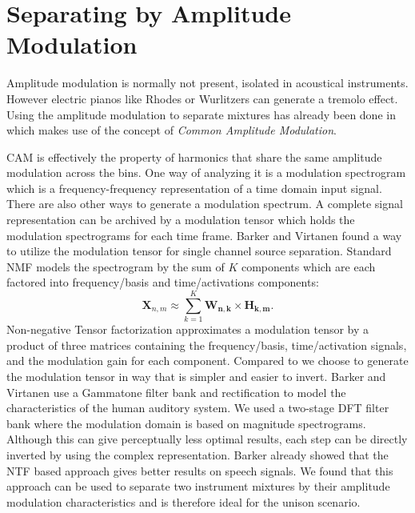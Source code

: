 \section{Separating by Amplitude Modulation}
\label{sub:am}

Amplitude modulation is normally not present, isolated in acoustical instruments. However electric pianos like Rhodes or Wurlitzers can generate a tremolo effect. Using the amplitude modulation to separate mixtures has already been done in \cite{li2009monaural} which makes use of the concept of \emph{Common Amplitude Modulation}.

\textsc{CAM} is effectively the property of harmonics that share the same amplitude modulation across the bins. One way of analyzing it is a modulation spectrogram which is a frequency-frequency representation of a time domain input signal. There are also other ways to generate a modulation spectrum. A complete signal representation can be archived by a modulation tensor which holds the modulation spectrograms for each time frame. Barker and Virtanen \cite{barker2013non} found a way to utilize the modulation tensor for single channel source separation. Standard NMF models the spectrogram by the sum of $K$ components which are each factored into frequency/basis and time/activations components:
\begin{equation}
   \mathbf{X}_{n,m} \approx \sum_{k=1}^{K}\mathbf{W_{n,k}}\times \mathbf{H_{k,m}}.
\end{equation}
Non-negative Tensor factorization approximates a modulation tensor by a product of three matrices containing the frequency/basis, time/activation signals, and the modulation gain for each component. Compared to \cite{barker2013non} we choose to generate the modulation tensor in way that is simpler and easier to invert. Barker and Virtanen use a Gammatone filter bank and  rectification to model the characteristics of the human auditory system. We used a two-stage DFT filter bank where the modulation domain is based on  magnitude spectrograms. Although this can give perceptually less optimal results, each step can be directly inverted by using the complex representation. Barker already showed that the NTF based approach gives better results on speech signals. We found that this approach can be used to separate two instrument mixtures by their amplitude modulation characteristics and is therefore ideal for the unison scenario.

